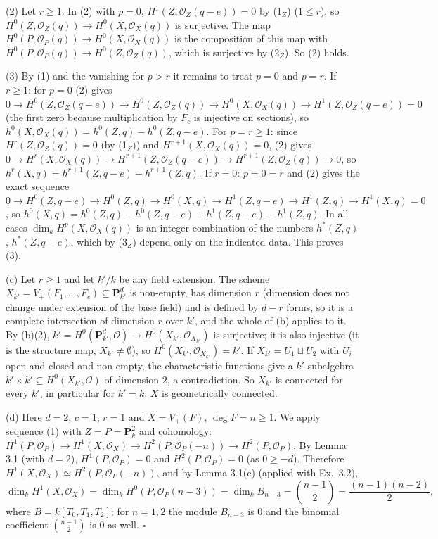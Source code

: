 \documentclass[11pt]{article}
\begin{document}
(2) Let $r\ge1$. In (2) with $p=0$, $H^1(Z,\mathcal O_Z(q-e))=0$ by (1$_Z$) ($1\le r$), so $H^0(Z,\mathcal O_Z(q))\to H^0(X,\mathcal O_X(q))$ is surjective. The map $H^0(P,\mathcal O_P(q))\to H^0(X,\mathcal O_X(q))$ is the composition of this map with $H^0(P,\mathcal O_P(q))\to H^0(Z,\mathcal O_Z(q))$, which is surjective by (2$_Z$). So (2) holds.

(3) By (1) and the vanishing for $p>r$ it remains to treat $p=0$ and $p=r$. If $r\ge1$: for $p=0$ (2) gives $0\to H^0(Z,\mathcal O_Z(q-e))\to H^0(Z,\mathcal O_Z(q))\to H^0(X,\mathcal O_X(q))\to H^1(Z,\mathcal O_Z(q-e))=0$ (the first zero because multiplication by $F_c$ is injective on sections), so $h^0(X,\mathcal O_X(q))=h^0(Z,q)-h^0(Z,q-e)$. For $p=r\ge1$: since $H^r(Z,\mathcal O_Z(q))=0$ (by (1$_Z$)) and $H^{r+1}(X,\mathcal O_X(q))=0$, (2) gives $0\to H^r(X,\mathcal O_X(q))\to H^{r+1}(Z,\mathcal O_Z(q-e))\to H^{r+1}(Z,\mathcal O_Z(q))\to0$, so $h^r(X,q)=h^{r+1}(Z,q-e)-h^{r+1}(Z,q)$. If $r=0$: $p=0=r$ and (2) gives the exact sequence $0\to H^0(Z,q-e)\to H^0(Z,q)\to H^0(X,q)\to H^1(Z,q-e)\to H^1(Z,q)\to H^1(X,q)=0$, so $h^0(X,q)=h^0(Z,q)-h^0(Z,q-e)+h^1(Z,q-e)-h^1(Z,q)$. In all cases $\dim_kH^p(X,\mathcal O_X(q))$ is an integer combination of the numbers $h^*(Z,q)$, $h^*(Z,q-e)$, which by (3$_Z$) depend only on the indicated data. This proves (3).

(c) Let $r\ge1$ and let $k'/k$ be any field extension. The scheme $X_{k'}=V_+(F_1,\dots,F_c)\subseteq\mathbf P^d_{k'}$ is non-empty, has dimension $r$ (dimension does not change under extension of the base field) and is defined by $d-r$ forms, so it is a complete intersection of dimension $r$ over $k'$, and the whole of (b) applies to it. By (b)(2), $k'=H^0(\mathbf P^d_{k'},\mathcal O)\to H^0(X_{k'},\mathcal O_{X_{k'}})$ is surjective; it is also injective (it is the structure map, $X_{k'}\ne\emptyset$), so $H^0(X_{k'},\mathcal O_{X_{k'}})=k'$. If $X_{k'}=U_1\sqcup U_2$ with $U_i$ open and closed and non-empty, the characteristic functions give a $k'$-subalgebra $k'\times k'\subseteq H^0(X_{k'},\mathcal O)$ of dimension $2$, a contradiction. So $X_{k'}$ is connected for every $k'$, in particular for $k'=\bar k$: $X$ is geometrically connected.

(d) Here $d=2$, $c=1$, $r=1$ and $X=V_+(F)$, $\deg F=n\ge1$. We apply sequence (1) with $Z=P=\mathbf P^2_k$ and cohomology: $H^1(P,\mathcal O_P)\to H^1(X,\mathcal O_X)\to H^2(P,\mathcal O_P(-n))\to H^2(P,\mathcal O_P)$. By Lemma 3.1 (with $d=2$), $H^1(P,\mathcal O_P)=0$ and $H^2(P,\mathcal O_P)=0$ (as $0\ge-d$). Therefore $H^1(X,\mathcal O_X)\simeq H^2(P,\mathcal O_P(-n))$, and by Lemma 3.1(c) (applied with Ex.~3.2),
\[ \dim_kH^1(X,\mathcal O_X)=\dim_kH^0(P,\mathcal O_P(n-3))=\dim_kB_{n-3}=\binom{n-1}{2}=\frac{(n-1)(n-2)}2, \]
where $B=k[T_0,T_1,T_2]$; for $n=1,2$ the module $B_{n-3}$ is $0$ and the binomial coefficient $\binom{n-1}{2}$ is $0$ as well. \hfill$\square$
\end{document}
